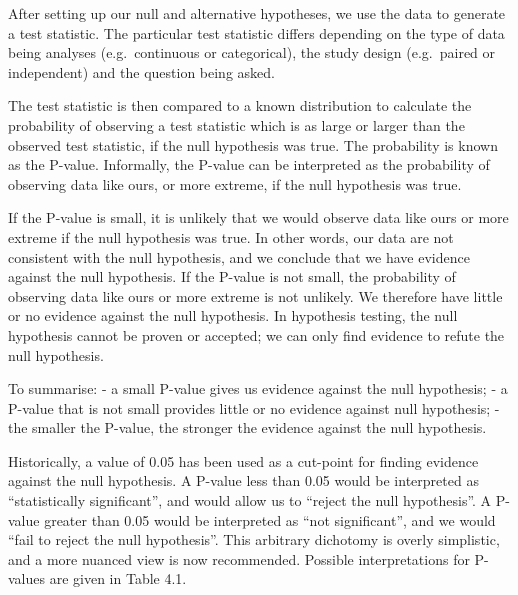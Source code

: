 \documentclass[
]{memoir}
\begin{document}
After setting up our null and alternative hypotheses, we use the data to generate a test statistic. The particular test statistic differs depending on the type of data being analyses (e.g.~continuous or categorical), the study design (e.g.~paired or independent) and the question being asked.

The test statistic is then compared to a known distribution to calculate the probability of observing a test statistic which is as large or larger than the observed test statistic, if the null hypothesis was true. The probability is known as the P-value.
Informally, the P-value can be interpreted as the probability of observing data like ours, or more extreme, if the null hypothesis was true.

If the P-value is small, it is unlikely that we would observe data like ours or more extreme if the null hypothesis was true. In other words, our data are not consistent with the null hypothesis, and we conclude that we have evidence against the null hypothesis. If the P-value is not small, the probability of observing data like ours or more extreme is not unlikely. We therefore have little or no evidence against the null hypothesis. In hypothesis testing, the null hypothesis cannot be proven or accepted; we can only find evidence to refute the null hypothesis.

To summarise:
- a small P-value gives us evidence against the null hypothesis;
- a P-value that is not small provides little or no evidence against null hypothesis;
- the smaller the P-value, the stronger the evidence against the null hypothesis.

Historically, a value of 0.05 has been used as a cut-point for finding evidence against the null hypothesis. A P-value less than 0.05 would be interpreted as ``statistically significant'', and would allow us to ``reject the null hypothesis''. A P-value greater than 0.05 would be interpreted as ``not significant'', and we would ``fail to reject the null hypothesis''. This arbitrary dichotomy is overly simplistic, and a more nuanced view is now recommended. Possible interpretations for P-values are given in Table 4.1.

 
  \providecommand{\huxb}[2]{\arrayrulecolor[RGB]{#1}\global\arrayrulewidth=#2pt}
  \providecommand{\huxvb}[2]{\color[RGB]{#1}\vrule width #2pt}
  \providecommand{\huxtpad}[1]{\rule{0pt}{#1}}
  \providecommand{\huxbpad}[1]{\rule[-#1]{0pt}{#1}}
\end{document}
